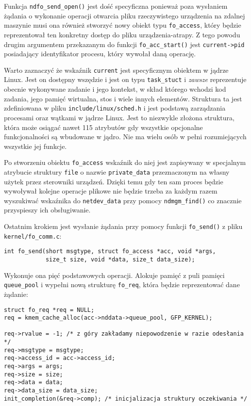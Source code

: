Funkcja \texttt{ndfo\_send\_open()} jest dość specyficzna ponieważ poza
wysłaniem żądania o wykonanie operacji otwarcia pliku rzeczywistego
urządzenia na zdalnej maszynie musi ona również stworzyć nowy obiekt
typu \texttt{fo\_access}, który będzie reprezentował ten konkretny
dostęp do pliku urządzenia-atrapy. Z tego powodu drugim argumentem
przekazanym do funkcji \texttt{fo\_acc\_start()} jest
\texttt{current-\textgreater{}pid} posiadający identyfikator procesu,
który wywołał daną operację.

Warto zaznaczyć że wskaźnik \texttt{current} jest specyficznym obiektem
w jądrze Linux. Jest on dostępny wszędzie i jest on typu
\texttt{task\_stuct} i \emph{zawsze} reprezentuje obecnie wykonywane
zadanie i jego kontekst, w skład którego wchodzi kod zadania, jego
pamięć wirtualna, stos i wiele innych elementów. Struktura ta jest
zdefiniowana w pliku \texttt{include/linux/sched.h} i jest podstawą
zarządzania procesami oraz wątkami w jądrze Linux. Jest to niezwykle
złożona struktura, która może osiągać nawet 115 atrybutów gdy wszystkie
opcjonalne funkcjonalności są wbudowane w jądro. Nie ma wielu osób w
pełni rozumiejących wszystkie jej funkcje.

Po stworzeniu obiektu \texttt{fo\_access} wskaźnik do niej jest
zapisywany w specjalnym atrybucie struktury \texttt{file} o nazwie
\texttt{private\_data} przeznaczonym na własny użytek przez sterowniki
urządzeń. Dzięki temu gdy ten sam proces będzie wywoływał kolejne
operacje plikowe nie będzie trzeba za każdym razem wyszukiwać wskaźnika
do \texttt{netdev\_data} przy pomocy \texttt{ndmgm\_find()} co znacznie
przyspieszy ich obsługiwanie.

Ostatnim krokiem jest wysłanie żądania przy pomocy funkcji
\texttt{fo\_send()} z pliku \texttt{kernel/fo\_comm.c}:

\begin{verbatim}
int fo_send(short msgtype, struct fo_access *acc, void *args,
            size_t size, void *data, size_t data_size);
\end{verbatim}

Wykonuje ona pięć podstawowych operacji. Alokuje pamięć z puli pamięci
\texttt{queue\_pool} i wypełni nową strukturę \texttt{fo\_req}, która
będzie reprezentować dane żądanie:

\begin{verbatim}
struct fo_req *req = NULL;
req = kmem_cache_alloc(acc->nddata->queue_pool, GFP_KERNEL);

req->rvalue = -1; /* z góry zakładamy niepowodzenie w razie odesłania */
req->msgtype = msgtype;
req->access_id = acc->access_id;
req->args = args;
req->size = size;
req->data = data;
req->data_size = data_size;
init_completion(&req->comp); /* inicjalizacja struktury oczekiwania */
\end{verbatim}

